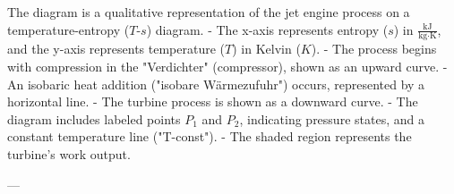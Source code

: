 The diagram is a qualitative representation of the jet engine process on a temperature-entropy (\( T \)-\( s \)) diagram.  
- The x-axis represents entropy (\( s \)) in \( \frac{\text{kJ}}{\text{kg·K}} \), and the y-axis represents temperature (\( T \)) in Kelvin (\( K \)).  
- The process begins with compression in the "Verdichter" (compressor), shown as an upward curve.  
- An isobaric heat addition ("isobare Wärmezufuhr") occurs, represented by a horizontal line.  
- The turbine process is shown as a downward curve.  
- The diagram includes labeled points \( P_1 \) and \( P_2 \), indicating pressure states, and a constant temperature line ("T-const").  
- The shaded region represents the turbine's work output.  

---